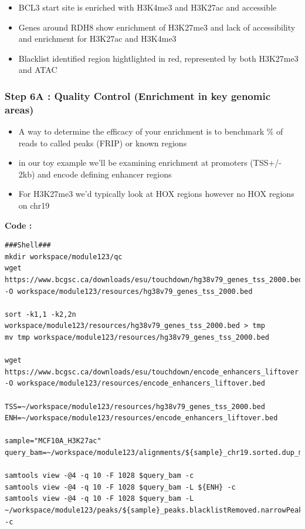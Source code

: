 \documentclass[
]{book}
\providecommand{\tightlist}{%
  \setlength{\itemsep}{0pt}\setlength{\parskip}{0pt}}
\begin{document}
\begin{itemize}
\tightlist
\item
  BCL3 start site is enriched with H3K4me3 and H3K27ac and accessible
\end{itemize}

\begin{itemize}
\tightlist
\item
  Genes around RDH8 show enrichment of H3K27me3 and lack of accessibility and enrichment for H3K27ac and H3K4me3
\end{itemize}

\begin{itemize}
\tightlist
\item
  Blacklist identified region hightlighted in red, represented by both H3K27me3 and ATAC
\end{itemize}

\subsubsection{Step 6A : Quality Control (Enrichment in key genomic areas)}\label{step-6a-quality-control-enrichment-in-key-genomic-areas}

\begin{itemize}
\tightlist
\item
  A way to determine the efficacy of your enrichment is to benchmark \% of reads to called peaks (FRIP) or known regions
\item
  in our toy example we'll be examining enrichment at promoters (TSS+/- 2kb) and encode defining enhancer regions
\item
  For H3K27me3 we'd typically look at HOX regions however no HOX regions on chr19
\end{itemize}

\textbf{Code :}

\begin{verbatim}
###Shell###
mkdir workspace/module123/qc
wget https://www.bcgsc.ca/downloads/esu/touchdown/hg38v79_genes_tss_2000.bed -O workspace/module123/resources/hg38v79_genes_tss_2000.bed

sort -k1,1 -k2,2n workspace/module123/resources/hg38v79_genes_tss_2000.bed > tmp
mv tmp workspace/module123/resources/hg38v79_genes_tss_2000.bed

wget https://www.bcgsc.ca/downloads/esu/touchdown/encode_enhancers_liftover.bed -O workspace/module123/resources/encode_enhancers_liftover.bed

TSS=~/workspace/module123/resources/hg38v79_genes_tss_2000.bed
ENH=~/workspace/module123/resources/encode_enhancers_liftover.bed

sample="MCF10A_H3K27ac"
query_bam=~/workspace/module123/alignments/${sample}_chr19.sorted.dup_marked.bam

samtools view -@4 -q 10 -F 1028 $query_bam -c
samtools view -@4 -q 10 -F 1028 $query_bam -L ${ENH} -c
samtools view -@4 -q 10 -F 1028 $query_bam -L ~/workspace/module123/peaks/${sample}_peaks.blacklistRemoved.narrowPeak -c
\end{verbatim}
\end{document}
